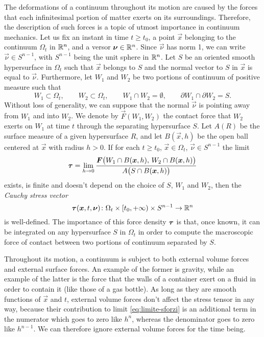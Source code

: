 The deformations of a continuum throughout its motion are caused by
the forces that each infinitesimal portion of matter exerts on
its surroundings. Therefore, the description of such forces is
a topic of utmost importance in continuum mechanics.
Let us fix an instant in time $t \geq t_0$, a point $\vec{x}$ belonging to
the continuum $\Omega_t$ in $\mathbb{R}^n$, and a versor $\bm{\nu} \in \mathbb{R}^n$.
Since $\vec{\nu}$ has norm 1, we can write $\vec{\nu} \in S^{n-1}$,
with $S^{n-1}$ being the unit sphere in $\mathbb{R}^n$.
Let $S$ be an oriented smooth hypersurface in $\Omega_t$ such that
$\vec{x}$ belongs to $S$ and the normal vector
to $S$ in $\vec{x}$ is equal to $\vec{\nu}$.
Furthermore, let $W_1$ and $W_2$ be two portions of continuum of positive
measure such that
\[
W_1 \subset \Omega_t,
\qquad W_2 \subset \Omega_t,
\qquad W_1 \cap W_2 = \emptyset,
\qquad \partial W_1 \cap \partial W_2 = S.
\]
Without loss of generality, we can suppose that the normal $\vec{\nu}$
is pointing away from $W_1$ and into $W_2$. We denote by $\vec{F}(W_1,W_2)$
the contact force that $W_2$ exerts on $W_1$ at time $t$ through the
separating hypersurface $S$. Let $A(R)$ be the surface measure
of a given hypersurface $R$, and let $B(\vec{x},h)$ be the open ball centered
at $\vec{x}$ with radius $h > 0$.
If for each $t \geq t_0$, $\vec{x} \in \Omega_t$, $\vec{\nu} \in S^{n-1}$
the limit
\begin{equation} \label{eq:limite-sforzi}
\bm{\tau} =
\lim_{h \to 0}
	\frac{\bm{F}\bigl(W_1 \cap B(\bm{x},h), \, W_2 \cap B(\bm{x},h)\bigr)}
	     {A\bigl(S \cap B(\bm{x},h)\bigr)}
\end{equation}
exists, is finite and doesn't depend on the choice of $S$, $W_1$ and $W_2$,
then the \emph{Cauchy stress vector}
\[
\bm{\tau}(\bm{x},t,\bm{\nu})
\colon \Omega_t \times [t_0,+\infty) \times S^{n-1} \to \mathbb{R}^n
\]
is well-defined.
The importance of this force density $\bm{\tau}$ is that,
once known, it can be integrated on any hypersurface $S$ in $\Omega_t$
in order to compute the macroscopic force of contact between two
portions of continuum separated by $S$.

Throughout its motion, a continuum is subject to both external volume
forces and external surface forces. An example of the former is gravity,
while an example of the latter is the force that the walls of a container
exert on a fluid in order to contain it (like those of a gas bottle).
As long as they are smooth functions of $\vec{x}$ and $t$,
external volume forces don't affect the stress tensor in any way,
because their contribution to limit \eqref{eq:limite-sforzi}
is an additional term in the numerator which goes to zero like $h^n$,
whereas the denominator goes to zero like $h^{n-1}$.
We can therefore ignore external volume forces for the time being.

